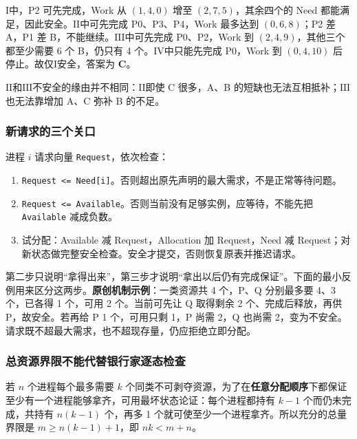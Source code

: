 \ensuremath{\mathrm{I}}中，P2 可先完成，Work 从 \((1,4,0)\) 增至 \((2,7,5)\)，其余四个的 Need 都能满足，因此安全。\ensuremath{\mathrm{II}}中可先完成 P0、P3、P4，Work 最多达到 \((0,6,8)\)；P2 差 A，P1 差 B，不能继续。\ensuremath{\mathrm{III}}中可先完成 P0、P2，Work 到 \((2,4,9)\)，其他三个都至少需要 6 个 B，仍只有 4 个。\ensuremath{\mathrm{IV}}中只能先完成 P0，Work 到 \((0,4,10)\) 后停止。故仅\ensuremath{\mathrm{I}}安全，答案为 \textbf{C}。

\ensuremath{\mathrm{II}}和\ensuremath{\mathrm{III}}不安全的缘由并不相同：\ensuremath{\mathrm{II}}即使 C 很多，A、B 的短缺也无法互相抵补；\ensuremath{\mathrm{III}}也无法靠增加 A、C 弥补 B 的不足。

\subsubsection{新请求的三个关口}\label{OS02-auto-27}

进程 \(i\) 请求向量 \texttt{Request}，依次检查：

\begin{enumerate}
\def\labelenumi{\arabic{enumi}.}
\tightlist
\item
  \texttt{Request <\allowbreak{}=\allowbreak{} Need[\allowbreak{}i]\allowbreak{}}。否则超出原先声明的最大需求，不是正常等待问题。
\item
  \texttt{Request <\allowbreak{}=\allowbreak{} Available}。否则当前没有足够实例，应等待，不能先把 \texttt{Available} 减成负数。
\item
  试分配：Available 减 Request，Allocation 加 Request，Need 减 Request；对新状态做完整安全检查。安全才提交，否则恢复原表并推迟请求。
\end{enumerate}

第二步只说明``拿得出来''，第三步才说明``拿出以后仍有完成保证''。下面的最小反例用来区分这两步。\textbf{原创机制示例}：一类资源共 4 个，P、Q 分别最多要 4、3 个，已各得 1 个，可用 2 个。当前可先让 Q 取得剩余 2 个、完成后释放，再供 P，故安全。若再给 P 1 个，可用只剩 1，P 尚需 2，Q 也尚需 2，变为不安全。请求既不超最大需求，也不超现存量，仍应拒绝立即分配。

\subsubsection{总资源界限不能代替银行家逐态检查}\label{OS02-auto-28}

若 \(n\) 个进程每个最多需要 \(k\) 个同类不可剥夺资源，为了在\textbf{任意分配顺序}下都保证至少有一个进程能够拿齐，可用最坏状态论证：每个进程都持有 \(k-1\) 个而仍未完成，共持有 \(n(k-1)\) 个，再多 1 个就可使至少一个进程拿齐。所以充分的总量界限是 \(m\ge n(k-1)+1\)，即 \(nk<m+n\)。

